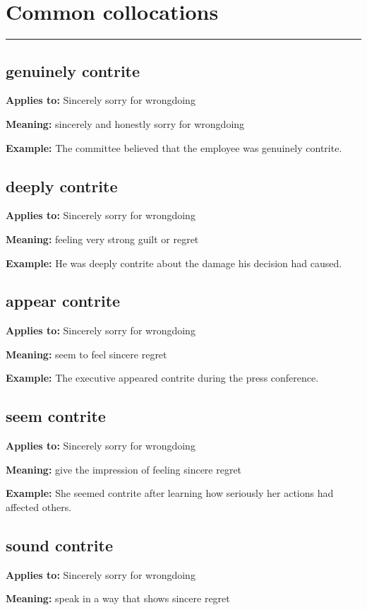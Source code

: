 \documentclass[11pt]{article}
\newcommand{\sectionrule}{\par\vspace{-0.5em}\noindent\textcolor{Accent}{\rule{\linewidth}{0.6pt}}\par}
\begin{document}
\section{Common collocations}
\sectionrule
\subsection{genuinely contrite}
\textbf{Applies to:} Sincerely sorry for wrongdoing

\textbf{Meaning:} sincerely and honestly sorry for wrongdoing

\textbf{Example:} The committee believed that the employee was genuinely contrite.

\subsection{deeply contrite}
\textbf{Applies to:} Sincerely sorry for wrongdoing

\textbf{Meaning:} feeling very strong guilt or regret

\textbf{Example:} He was deeply contrite about the damage his decision had caused.

\subsection{appear contrite}
\textbf{Applies to:} Sincerely sorry for wrongdoing

\textbf{Meaning:} seem to feel sincere regret

\textbf{Example:} The executive appeared contrite during the press conference.

\subsection{seem contrite}
\textbf{Applies to:} Sincerely sorry for wrongdoing

\textbf{Meaning:} give the impression of feeling sincere regret

\textbf{Example:} She seemed contrite after learning how seriously her actions had affected others.

\subsection{sound contrite}
\textbf{Applies to:} Sincerely sorry for wrongdoing

\textbf{Meaning:} speak in a way that shows sincere regret
\end{document}
